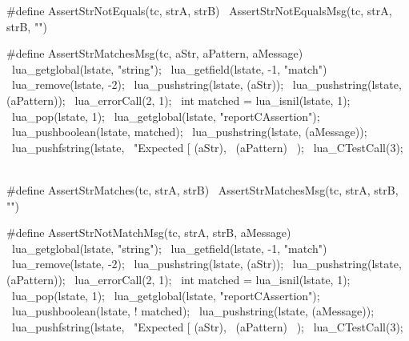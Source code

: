 #define AssertStrNotEquals(tc, strA, strB) \
  AssertStrNotEqualsMsg(tc, strA, strB, "")
\stopCHeader

\stopTestSuite

\startTestSuite[assertStrMatches]

\startCHeader
#define AssertStrMatchesMsg(tc, aStr, aPattern, aMessage) \
{                                                         \
  lua_getglobal(lstate, "string");                        \
  lua_getfield(lstate, -1, "match")                       \
  lua_remove(lstate, -2);                                 \
  lua_pushstring(lstate, (aStr));                         \
  lua_pushstring(lstate, (aPattern));                     \
  lua_errorCall(2, 1);                                    \
  int matched = lua_isnil(lstate, 1);                     \
  lua_pop(lstate, 1);                                     \
  lua_getglobal(lstate, "reportCAssertion");              \
  lua_pushboolean(lstate, matched);                       \
  lua_pushstring(lstate, (aMessage));                     \
  lua_pushfstring(lstate,                                 \
      "Expected [%
      (aStr),                                             \
      (aPattern)                                          \
    );                                                    \
  lua_CTestCall(3);                                       \
}

#define AssertStrMatches(tc, strA, strB) \
  AssertStrMatchesMsg(tc, strA, strB, "")
\stopCHeader

\stopTestSuite

\startTestSuite[assertStrNotMatch]

\startCHeader
#define AssertStrNotMatchMsg(tc, strA, strB, aMessage) \
{                                                      \
  lua_getglobal(lstate, "string");                     \
  lua_getfield(lstate, -1, "match")                    \
  lua_remove(lstate, -2);                              \
  lua_pushstring(lstate, (aStr));                      \
  lua_pushstring(lstate, (aPattern));                  \
  lua_errorCall(2, 1);                                 \
  int matched = lua_isnil(lstate, 1);                  \
  lua_pop(lstate, 1);                                  \
  lua_getglobal(lstate, "reportCAssertion");           \
  lua_pushboolean(lstate, ! matched);                  \
  lua_pushstring(lstate, (aMessage));                  \
  lua_pushfstring(lstate,                              \
      "Expected [%
      (aStr),                                          \
      (aPattern)                                       \
    );                                                 \
  lua_CTestCall(3);                                    \
}


